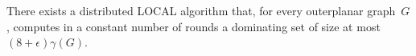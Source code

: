 \begin{theorem}\label{thm:outer}
  There exists a distributed LOCAL algorithm that, for every outerplanar graph~$G$, computes in a constant number of rounds a
  dominating set of size at most $(8+\epsilon)\gamma(G)$.
\end{theorem}


